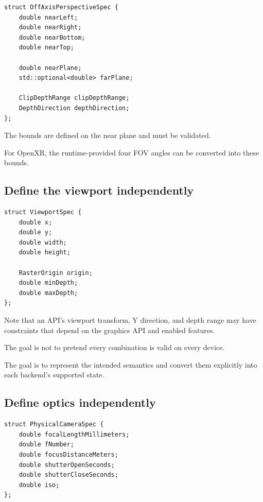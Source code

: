 \begin{verbatim}
struct OffAxisPerspectiveSpec {
    double nearLeft;
    double nearRight;
    double nearBottom;
    double nearTop;

    double nearPlane;
    std::optional<double> farPlane;

    ClipDepthRange clipDepthRange;
    DepthDirection depthDirection;
};
\end{verbatim}

The bounds are defined on the near plane and must be validated.

For OpenXR, the runtime-provided four FOV angles can be converted into these bounds.

\subsection{Define the viewport independently}\label{02-foundations-ii-ch037-define-the-viewport-independently}

\hypertarget{02-foundations-ii-ch037-define-the-viewport-independently}{}

\begin{verbatim}
struct ViewportSpec {
    double x;
    double y;
    double width;
    double height;

    RasterOrigin origin;
    double minDepth;
    double maxDepth;
};
\end{verbatim}

Note that an API's viewport transform, Y direction, and depth range may have constraints that depend on the graphics API and enabled features.

The goal is not to pretend every combination is valid on every device.

The goal is to represent the intended semantics and convert them explicitly into each backend's supported state.

\subsection{Define optics independently}\label{02-foundations-ii-ch037-define-optics-independently}

\hypertarget{02-foundations-ii-ch037-define-optics-independently}{}

\begin{verbatim}
struct PhysicalCameraSpec {
    double focalLengthMillimeters;
    double fNumber;
    double focusDistanceMeters;
    double shutterOpenSeconds;
    double shutterCloseSeconds;
    double iso;
};
\end{verbatim}

